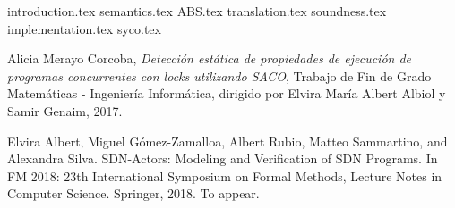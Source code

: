 \documentclass[spanish, a4paper, 12pt] {book}
\begin{document}
{introduction.tex}
{semantics.tex}
{ABS.tex}
{translation.tex}
{soundness.tex}
{implementation.tex}
{syco.tex}

\begin{thebibliography}{9}

  Alicia Merayo Corcoba,
  \textit{Detección estática de propiedades de ejecución de programas concurrentes con locks utilizando SACO},
  Trabajo de Fin de Grado Matemáticas - Ingeniería Informática,
  dirigido por Elvira María Albert Albiol y Samir Genaim,
  2017.

 Elvira Albert, Miguel Gómez-Zamalloa, Albert Rubio, Matteo Sammartino, and Alexandra Silva. SDN-Actors: Modeling and Verification of SDN Programs. In FM 2018: 23th International Symposium on Formal Methods, Lecture Notes in Computer Science. Springer, 2018. To appear.
\end{thebibliography}
\end{document}
